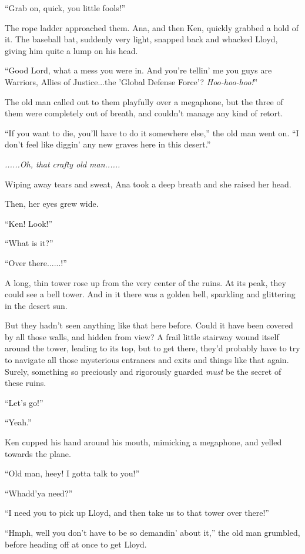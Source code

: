 \documentclass[
]{article}
\begin{document}
``Grab on, quick, you little fools!''

The rope ladder approached them. Ana, and then Ken, quickly grabbed a
hold of it. The baseball bat, suddenly very light, snapped back and
whacked Lloyd, giving him quite a lump on his head.

``Good Lord, what a mess you were in. And you're tellin' me you guys are
Warriors, Allies of Justice...the 'Global Defense Force'?
\emph{Hoo-hoo-hoo!}''

The old man called out to them playfully over a megaphone, but the three
of them were completely out of breath, and couldn't manage any kind of
retort.

``If you want to die, you'll have to do it somewhere else,'' the old man
went on. ``I don't feel like diggin' any new graves here in this
desert.''

\emph{......Oh, that crafty old man......}

Wiping away tears and sweat, Ana took a deep breath and she raised her
head.

Then, her eyes grew wide.

``Ken! Look!''

``What is it?''

``Over there......!''

A long, thin tower rose up from the very center of the ruins. At its
peak, they could see a bell tower. And in it there was a golden bell,
sparkling and glittering in the desert sun.

But they hadn't seen anything like that here before. Could it have been
covered by all those walls, and hidden from view? A frail little
stairway wound itself around the tower, leading to its top, but to get
there, they'd probably have to try to navigate all those mysterious
entrances and exits and things like that again. Surely, something so
preciously and rigorously guarded \emph{must} be the secret of these
ruins.

``Let's go!''

``Yeah.''

Ken cupped his hand around his mouth, mimicking a megaphone, and yelled
towards the plane.

``Old man, heey! I gotta talk to you!''

``Whadd'ya need?''

``I need you to pick up Lloyd, and then take us to that tower over
there!''

``Hmph, well you don't have to be so demandin' about it,'' the old man
grumbled, before heading off at once to get Lloyd.
\end{document}

